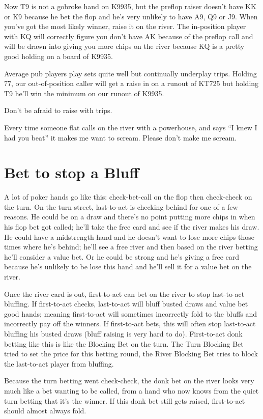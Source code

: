 Now T9 is not a gobroke hand on K9935, but the preflop raiser doesn't
have KK or K9 because he bet the flop and he's very unlikely to have
A9, Q9 or J9. When you've got the most likely winner, raise it on
the river. The in-position player with KQ will correctly figure you
don't have AK because of the preflop call and will be drawn into
giving you more chips on the river because KQ is a pretty good holding
on a board of K9935.

Average pub players play sets quite well but continually underplay
trips. Holding 77, our out-of-position caller will get a raise in on a
runout of KT725 but holding T9 he'll win the minimum on our runout of
K9935.

Don't be afraid to raise with trips.

Every time someone flat calls on the river with a powerhouse, and
says ``I knew I had you beat'' it makes me want to scream. Please
don't make me scream.

\section{Bet to stop a Bluff}

A lot of poker hands go like this: check-bet-call on the flop
then check-check on the turn. On the turn street, last-to-act
is checking behind for one of a few reasons. He could be on a draw
and there's no point putting more chips in when his flop bet got
called; he'll take the free card and see if the river makes his draw.
He could have a midstrength hand and he doesn't want to lose more chips
those times where he's behind; he'll see a free river and then based
on the river betting he'll consider a value bet. Or he could be
strong and he's giving a free card because he's unlikely to be lose
this hand and he'll sell it for a value bet on the river.

Once the river card is out, first-to-act can bet on the river
to stop last-to-act bluffing. If first-to-act checks, last-to-act
will bluff busted draws and value bet good hands; meaning first-to-act
will sometimes incorrectly fold to the bluffs and incorrectly pay
off the winners. If first-to-act bets, this will often
stop last-to-act bluffing his busted draws (bluff raising is
very hard to do). First-to-act donk betting like this is like
the Blocking Bet on the turn. The Turn Blocking Bet tried to set
the price for this betting round, the River Blocking Bet tries
to block the last-to-act player from bluffing.

Because the turn betting went check-check, the donk bet
on the river looks very much like a bet wanting to be called,
from a hand who now knows from the quiet turn betting that it's
the winner. If this donk bet still gets raised, first-to-act
should almost always fold.

